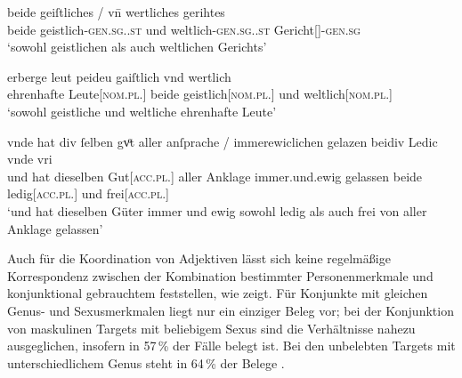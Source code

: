 \begin{exe}
\ex \label{ex:caobeidkoordtarg}
	\begin{xlist}
	\ex \label{ex:caobeidkoordtarg_1}
		\gll beide geiſtliches / vn̄ wertliches gerihtes \\
			beide geistlich-\textsc{gen.sg.\NeutI.st} {} und
			weltlich-\textsc{gen.sg.\NeutI.st} Gericht[\NeutI]-\textsc{gen.sg} \\
		\trans `sowohl geistlichen als auch weltlichen Gerichts'
			\parencites(Nr.~1764, Bamberg, 1293)[71,26]{cao3}

	\ex \label{ex:caobeidkoordtarg_2}
		\gll erberge leut peideu gaiſtlich vnd wertlich \\
			ehrenhafte Leute[\textsc{nom.pl.\MascA}] beide geistlich[\textsc{nom.pl.\MascA}]
			und weltlich[\textsc{nom.pl.\MascA}] \\
		\trans `sowohl geistliche und weltliche ehrenhafte Leute'
			\parencites(Nr.~1153, Engelthal, Kr.~Nürnberger Land, 1289)[431,44]{cao2}

	\ex \label{ex:caobeidkoordtarg_3}
		\gll vnde hat {div ſelben} gvͦt \textelp{} aller anſprache /
			immerewiclichen gelazen beidiv Ledic vnde vri \\
			und hat dieselben Gut[\textsc{acc.pl.\NeutI}] {} aller Anklage {}
			immer.und.ewig gelassen beide ledig[\textsc{acc.pl.\NeutI}] und
			frei[\textsc{acc.pl.\NeutI}] \\
		\trans `und hat dieselben Güter \textelp{} immer und ewig sowohl
			ledig als auch frei von aller Anklage gelassen'
			\parencites(Nr.~2293, Bamberg, 1295)[420,21--23]{cao3}
	\end{xlist}
\end{exe}

Auch für die Koordination von Adjektiven lässt sich keine regelmäßige
Korrespondenz zwischen der Kombination bestimmter Personenmerkmale und
konjunktional gebrauchtem  feststellen, wie
 zeigt. Für Konjunkte mit gleichen Genus- und
Sexusmerkmalen liegt nur ein einziger Beleg vor; bei der Konjunktion von
maskulinen Targets mit beliebigem Sexus sind die Verhältnisse nahezu
ausgeglichen, insofern in 57\,\% der Fälle  belegt ist. Bei den
unbelebten Targets mit unterschiedlichem Genus steht in 64\,\% der Belege
.

